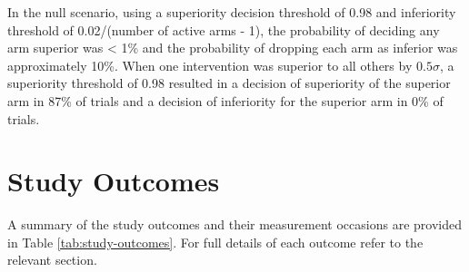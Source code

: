 \documentclass[
]{article}
\begin{document}
In the null scenario, using a superiority decision threshold of 0.98 and inferiority threshold of 0.02/(number of active arms - 1), the probability of deciding any arm superior was < 1\% and the probability of dropping each arm as inferior was approximately 10\%.
When one intervention was superior to all others by $0.5\sigma$, a superiority threshold of 0.98 resulted in a decision of superiority of the superior arm in 87\% of trials and a decision of inferiority for the superior arm in 0\% of trials.

\clearpage

\hypertarget{outcomes}{
  \section{Study Outcomes}\label{outcomes}}

A summary of the study outcomes and their measurement occasions are provided in Table \ref{tab:study-outcomes}.
For full details of each outcome refer to the relevant section.
\end{document}
